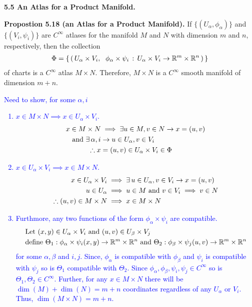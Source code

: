 \documentclass[10pt,a4paper]{report}
\newcommand{\BLUE}[1]{\textcolor{blue}{#1}}
\begin{document}
\newpage
\noindent\textbf{5.5 An Atlas for a Product Manifold.}

\textbf{Propostion 5.18 (an Atlas for a Product Manifold).}  If $\{(U_\alpha, \phi_\alpha)\}$ and $\{(V_i,\psi_i)\}$ are $C^\infty$ atlases for the manifold $M$ and $N$ with dimension $m$ and $n$, respectively, then the collection 
\begin{align*}
	\Phi=\left \{\, \left (\, U_\alpha\times V_i,\;\  \phi_\alpha\times \psi_i\,:\,U_\alpha\times V_i \to \mathbb{R}^m\times \mathbb{R}^n  \,\right ) \,\right \}
\end{align*}of charts is a $C^\infty$ atlas $M\times N$.  Therefore, $M\times N$ is a $C^\infty$ smooth manifold of dimension $m+n$.\\


\BLUE{\noindent Need to show, for some $\alpha, i$
\begin{enumerate}
	\item $x \in M \times N \implies x \in U_\alpha \times V_i$.
	\begin{align*}
		x \in M \times N &\implies \exists u \in M, v \in N \to x = (u,v) \\
		\text{ and } \exists\, \alpha, i &\to u \in U_\alpha, v \in V_i \\
		\therefore x &= (u,v) \in U_\alpha \times V_i \in \Phi
	\end{align*}
	\item $x \in  U_\alpha \times V_i \implies x \in M \times N$. 
	\begin{align*}
		x \in  U_\alpha \times V_i &\implies \exists\, u\in U_\alpha, v \in V_i \to x = (u,v)\\
		u \in U_\alpha &\implies u \in M \text{ and } v \in V_i \implies v \in N\\
		\therefore (u,v) \in M\times N &\implies x \in M \times N
	\end{align*}
	\item Furthmore, any two functions of the form $\phi_\alpha \times \psi_i$ are compatible.
	\begin{align*}
	\text{Let } (x,y) &\in U_\alpha \times V_i \text{ and } (u,v) \in U_\beta \times V_j  \\
	\text{define } \Theta_1 &: \phi_\alpha\times \psi_i(x,y)\to \mathbb{R}^m\times \mathbb{R}^n  \text{ and } \Theta_2 : \phi_\beta\times \psi_j(u,v)\to \mathbb{R}^m\times \mathbb{R}^n  
\end{align*}for some $\alpha, \beta$ and $i, j$.  Since, $\phi_\alpha$ is compatible with $\phi_\beta$ and $\psi_i$ is compatible with $\psi_j$ so is $\Theta_1$ compatible with $\Theta_2$.  Since $\phi_\alpha, \phi_\beta, \psi_i, \psi_j \in C^\infty$ so is $\Theta_1, \Theta_2 \in C^\infty$.  Further, for any $x \in M\times N$ there will be $\dim(M)+\dim(N)=m+n$ coordinates regardless of any $U_\alpha$ or $V_i$.  Thus, $\dim(M \times N) = m+n$.
\end{enumerate}
}
\end{document}
